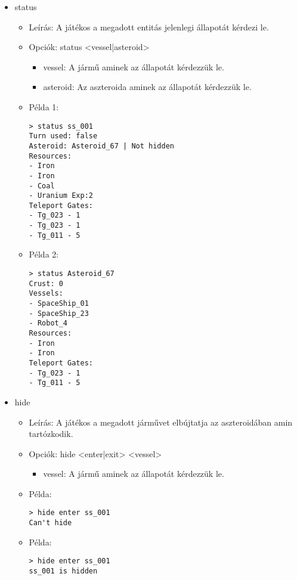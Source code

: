 \documentclass[../../projlab]{subfiles}
\begin{document}
\begin{itemize}
    \item status
    \begin{itemize}
        \item Leírás: A játékos a megadott entitás jelenlegi állapotát kérdezi le.
        \item Opciók: status <vessel|asteroid>
        \begin{itemize}
            \item vessel: A jármű aminek az állapotát kérdezzük le.
            \item asteroid: Az aszteroida aminek az állapotát kérdezzük le.
        \end{itemize}
        \item Példa 1:
            \begin{verbatim}
> status ss_001
Turn used: false
Asteroid: Asteroid_67 | Not hidden
Resources:
- Iron
- Iron
- Coal
- Uranium Exp:2
Teleport Gates:
- Tg_023 - 1
- Tg_023 - 1
- Tg_011 - 5
            \end{verbatim}
        \item Példa 2:
            \begin{verbatim}
> status Asteroid_67
Crust: 0
Vessels:
- SpaceShip_01
- SpaceShip_23
- Robot_4
Resources:
- Iron
- Iron
Teleport Gates:
- Tg_023 - 1
- Tg_011 - 5
            \end{verbatim}        
    \end{itemize}


    \item hide
    \begin{itemize}
        \item Leírás: A játékos a megadott járművet elbújtatja az aszteroidában amin tartózkodik.
        \item Opciók: hide <enter|exit> <vessel>
        \begin{itemize}
            \item vessel: A jármű aminek az állapotát kérdezzük le.
        \end{itemize}
        \item Példa:
            \begin{verbatim}
> hide enter ss_001
Can't hide
            \end{verbatim}
        \item Példa:
            \begin{verbatim}
> hide enter ss_001
ss_001 is hidden
            \end{verbatim}            
    \end{itemize}



\end{itemize}
\end{document}

